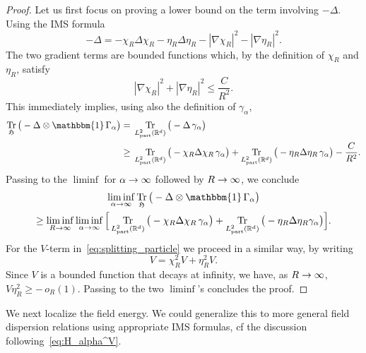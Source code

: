 \documentclass[AHL,Unicode,longabstracts,published]{cedram}
\DeclareMathOperator{\Tr}{Tr}
\DeclareMathOperator{\partt}{part}
\newcommand{\R}{\mathbb{R}}
\newcommand{\gH}{\mathfrak{H}}
\newcommand{\1}{\mathds{1}}
\renewcommand*{\to}{\mathchoice{\longrightarrow}{\rightarrow}{\rightarrow}{\rightarrow}}
\begin{document}
\begin{proof}
Let us first focus on proving a lower bound on the term involving $-\Delta$. Using the IMS formula
\begin{equation*}
-\Delta=-\chi_R \Delta \chi_R-\eta_R \Delta \eta_R-|\nabla \chi_R|^2 - |\nabla \eta_R|^2.
\end{equation*}
The two gradient terms are bounded functions which, by the definition of $\chi_R$ and $\eta_R$, satisfy
\begin{equation*}
|\nabla\chi_R|^2+|\nabla \eta_R|^2 \le \frac{C}{R^2}.
\end{equation*}
This immediately implies, using also the definition of $\gamma_\alpha$,
\begin{equation*}
\begin{split}
\Tr_{ \gH}\big(-\Delta\otimes\mathbbm{1}\,\Gamma_\alpha \big)=\;&\Tr_{L^2_{\partt}(\R^d)}\big(-\Delta\, \gamma_\alpha\big)\\
\ge\;&\Tr_{L^2_{\partt}(\R^d)}\big(-\chi_R\Delta\chi_R \,\gamma_\alpha\big) + \Tr_{L^2_{\partt}(\R^d)}\big(-\eta_R\Delta \eta_R \,\gamma_\alpha\big)-\frac{C}{R^2}.
\end{split}
\end{equation*}
Passing to the $\liminf$ for $\alpha\to\infty$ followed by $R\to\infty$, we conclude
\begin{multline*}
\liminf_{\alpha\to\infty} \Tr_{ \gH}\big(-\Delta\otimes\mathbbm{1}\,\Gamma_\alpha \big)\\
\ge \liminf_{R \to\infty} \liminf_{\alpha\to\infty}\Big[\Tr_{L^2_{\partt}(\R^d)}\big(-\chi_R \Delta\chi_R\,\gamma_\alpha\big)+ \Tr_{L^2_{\partt}(\R^d)}\big(-\eta_R\Delta\eta_R\gamma_\alpha\big) \Big].
\end{multline*}
For the $V$-term in~\eqref{eq:splitting_particle} we proceed in a similar way, by writing
\begin{equation*}
V=\chi_R^2 V + \eta_R^2 V.
\end{equation*}
Since $V$ is a bounded function that decays at infinity, we have, as $R\to\infty$,\linebreak$V \eta_R^2 \ge - \,o_R(1)$. Passing to the two $\liminf$'s concludes the proof.
\end{proof}


We next localize the field energy. We could generalize this to more general field dispersion relations using appropriate IMS formulas, cf the discussion following~\eqref{eq:H_alpha^V}.
\end{document}
